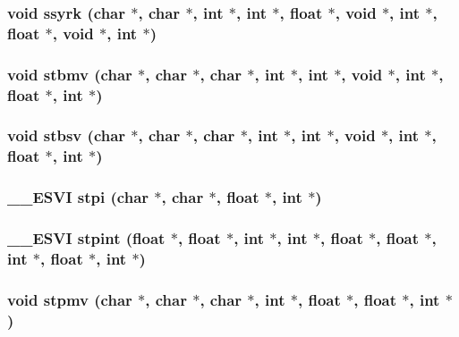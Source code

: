 \subsubsection{\setlength{\rightskip}{0pt plus 5cm}void ssyrk (char $\ast$, char $\ast$, int $\ast$, int $\ast$, float $\ast$, void $\ast$, int $\ast$, float $\ast$, void $\ast$, int $\ast$)}\label{essl_8h_fa9baf521102514df50ead7ea35a624e}


\subsubsection{\setlength{\rightskip}{0pt plus 5cm}void stbmv (char $\ast$, char $\ast$, char $\ast$, int $\ast$, int $\ast$, void $\ast$, int $\ast$, float $\ast$, int $\ast$)}\label{essl_8h_61143df8ff304fc82ee63b31d233e5d0}


\subsubsection{\setlength{\rightskip}{0pt plus 5cm}void stbsv (char $\ast$, char $\ast$, char $\ast$, int $\ast$, int $\ast$, void $\ast$, int $\ast$, float $\ast$, int $\ast$)}\label{essl_8h_7d329a25cca32c2973df80ad23ccec4f}


\subsubsection{\setlength{\rightskip}{0pt plus 5cm}\_\-\_\-ESVI stpi (char $\ast$, char $\ast$, float $\ast$, int $\ast$)}\label{essl_8h_135c04b930373cc9cc8c52862a020e45}


\subsubsection{\setlength{\rightskip}{0pt plus 5cm}\_\-\_\-ESVI stpint (float $\ast$, float $\ast$, int $\ast$, int $\ast$, float $\ast$, float $\ast$, int $\ast$, float $\ast$, int $\ast$)}\label{essl_8h_cabd1e6584be807ae02a0046cd832d95}


\subsubsection{\setlength{\rightskip}{0pt plus 5cm}void stpmv (char $\ast$, char $\ast$, char $\ast$, int $\ast$, float $\ast$, float $\ast$, int $\ast$)}\label{essl_8h_42a6702c75b041e43f5c690946b57d9c}


